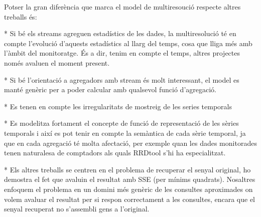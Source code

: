 Potser la gran diferència que marca el model de multiresoució respecte altres treballs és:

* Si bé els streams agreguen estadístics de les dades, la multiresolució té en compte l'evolució d'aquests estadístics al llarg del temps, cosa que lliga més amb l'àmbit del monitoratge. És a dir, tenim en compte el temps, altres projectes només avaluen el moment present.

* Si bé l'orientació a agregadors amb stream és molt interessant, el model es manté genèric per a poder calcular amb qualsevol funció d'agregació.

* Es tenen en compte les irregularitats de mostreig de les series temporals

* Es modelitza fortament el concepte de funció de representació de les sèries temporals i així es pot tenir en compte la semàntica de cada sèrie temporal, ja que en cada agregació té molta afectació, per exemple quan les dades monitorades tenen naturalesa de comptadors als quals RRDtool s'hi ha especialitzat.


* Els altres treballs se centren en el problema de recuperar el senyal original, ho demostra el fet que avaluin el resultat amb SSE (per mínims quadrats). Nosaltres enfoquem el problema en un domini més genèric de les consultes aproximades on volem avaluar el resultat per si respon correctament a les consultes, encara que el senyal recuperat no s'assembli gens a l'original.